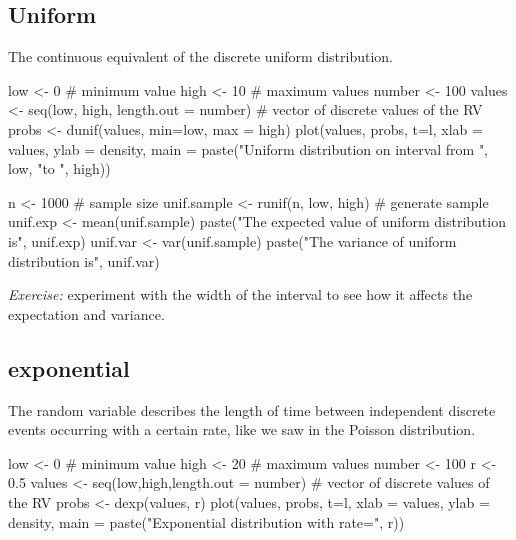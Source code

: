 \documentclass[
  letterpaper,
  DIV=11,
  numbers=noendperiod]{scrreprt}
\newenvironment{Shaded}{\begin{snugshade}}{\end{snugshade}}
\newcommand{\NormalTok}[1]{\textcolor[rgb]{0.00,0.23,0.31}{#1}}
\begin{document}
\subsection{Uniform}\label{uniform-1}

The continuous equivalent of the discrete uniform distribution.

\begin{Shaded}
\begin{Highlighting}[]
\NormalTok{low \textless{}{-} 0 \# minimum value}
\NormalTok{high \textless{}{-} 10 \# maximum values}
\NormalTok{number \textless{}{-} 100}
\NormalTok{values \textless{}{-} seq(low, high, length.out = number) \# vector of discrete values of the RV}
\NormalTok{probs \textless{}{-} dunif(values, min=low, max = high)}
\NormalTok{plot(values, probs, t=\textquotesingle{}l\textquotesingle{}, xlab = \textquotesingle{}values\textquotesingle{}, ylab = \textquotesingle{}density\textquotesingle{},}
\NormalTok{        main = paste("Uniform distribution on interval from ", low, "to ", high))}
\end{Highlighting}
\end{Shaded}

\begin{Shaded}
\begin{Highlighting}[]
\NormalTok{n \textless{}{-} 1000 \# sample size}
\NormalTok{unif.sample \textless{}{-} runif(n, low, high) \# generate sample}
\NormalTok{unif.exp \textless{}{-} mean(unif.sample)}
\NormalTok{paste("The expected value of uniform distribution is", unif.exp)}
\NormalTok{unif.var \textless{}{-} var(unif.sample)}
\NormalTok{paste("The variance of uniform distribution is", unif.var)}
\end{Highlighting}
\end{Shaded}

\emph{Exercise:} experiment with the width of the interval to see how it
affects the expectation and variance.

\subsection{exponential}\label{exponential}

The random variable describes the length of time between independent
discrete events occurring with a certain rate, like we saw in the
Poisson distribution.

\begin{Shaded}
\begin{Highlighting}[]
\NormalTok{low \textless{}{-} 0 \# minimum value}
\NormalTok{high \textless{}{-} 20 \# maximum values}
\NormalTok{number \textless{}{-} 100}
\NormalTok{r \textless{}{-} 0.5}
\NormalTok{values \textless{}{-} seq(low,high,length.out = number) \# vector of discrete values of the RV}
\NormalTok{probs \textless{}{-} dexp(values, r)}
\NormalTok{plot(values, probs, t=\textquotesingle{}l\textquotesingle{}, xlab = \textquotesingle{}values\textquotesingle{}, ylab = \textquotesingle{}density\textquotesingle{},}
\NormalTok{        main = paste("Exponential distribution with rate=", r))}
\end{Highlighting}
\end{Shaded}
\end{document}
